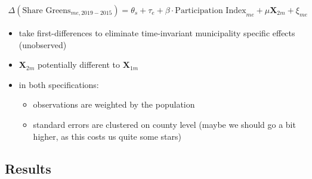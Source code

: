 \begin{align}
	\Delta(\text{Share Greens}_{me,2019-2015}) = \theta_s + \tau_e + \beta\cdot\text{Participation Index}_{me} + \mu \mathbf{X}_{2m} + \xi_{me}\label{eq_greta_cons:fd_vote_share_greens}
\end{align}
\begin{itemize}
	\item take first-differences to eliminate time-invariant municipality specific effects (unobserved)
	\item $\mathbf{X}_{2m}$ potentially different to $\mathbf{X}_{1m}$
	\item in both specifications: 
	\begin{itemize}
		\item observations are weighted by the population
		\item standard errors are clustered on county level (maybe we should go a bit higher, as this costs us quite some stars)
	\end{itemize}
	
\end{itemize}



\subsection{Results}

